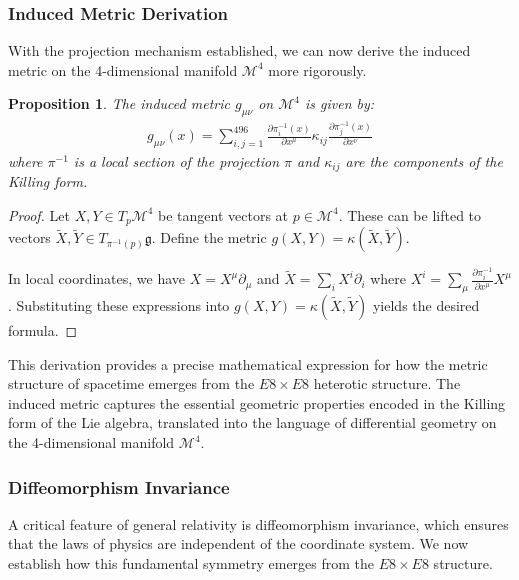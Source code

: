 \documentclass[11pt,english,twoside]{article}
\newtheorem{proposition}{Proposition}
\begin{document}
\subsubsection{Induced Metric Derivation}

With the projection mechanism established, we can now derive the induced metric on the 4-dimensional manifold $\mathcal{M}^4$ more rigorously.

\begin{proposition}
The induced metric $g_{\mu\nu}$ on $\mathcal{M}^4$ is given by:
\begin{align}
g_{\mu\nu}(x) = \sum_{i,j=1}^{496} \frac{\partial \pi^{-1}_i(x)}{\partial x^\mu} \kappa_{ij} \frac{\partial \pi^{-1}_j(x)}{\partial x^\nu}
\end{align}
where $\pi^{-1}$ is a local section of the projection $\pi$ and $\kappa_{ij}$ are the components of the Killing form.
\end{proposition}

\begin{proof}
Let $X, Y \in T_p\mathcal{M}^4$ be tangent vectors at $p \in \mathcal{M}^4$. These can be lifted to vectors $\tilde{X}, \tilde{Y} \in T_{\pi^{-1}(p)}\mathfrak{g}$. Define the metric $g(X,Y) = \kappa(\tilde{X},\tilde{Y})$. 

In local coordinates, we have $X = X^\mu \partial_\mu$ and $\tilde{X} = \sum_i X^i \partial_i$ where $X^i = \sum_\mu \frac{\partial \pi^{-1}_i}{\partial x^\mu}X^\mu$. Substituting these expressions into $g(X,Y) = \kappa(\tilde{X},\tilde{Y})$ yields the desired formula.
\end{proof}

This derivation provides a precise mathematical expression for how the metric structure of spacetime emerges from the $E8\times E8$ heterotic structure. The induced metric captures the essential geometric properties encoded in the Killing form of the Lie algebra, translated into the language of differential geometry on the 4-dimensional manifold $\mathcal{M}^4$.

\subsubsection{Diffeomorphism Invariance}

A critical feature of general relativity is diffeomorphism invariance, which ensures that the laws of physics are independent of the coordinate system. We now establish how this fundamental symmetry emerges from the $E8\times E8$ structure.
\end{document}
